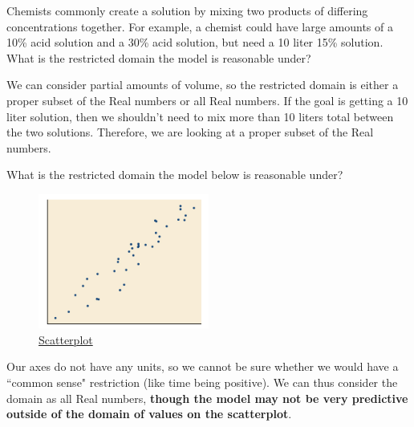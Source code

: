 \documentclass{ximera}
\begin{document}
\begin{question}
Chemists commonly create a solution by mixing two products of differing concentrations together. For example, a chemist could have large amounts of a 10\% acid solution and a 30\% acid solution, but need a 10 liter 15\% solution. What is the restricted domain the model is reasonable under?

\begin{multipleChoice}
\end{multipleChoice}

\begin{feedback}[correct]
We can consider partial amounts of volume, so the restricted domain is either a proper subset of the Real numbers or all Real numbers. If the goal is getting a 10 liter solution, then we shouldn't need to mix more than 10 liters total between the two solutions. Therefore, we are looking at a proper subset of the Real numbers. 
\end{feedback}

\end{question}

\begin{question}
What is the restricted domain the model below is reasonable under?
\begin{figure}
\includegraphics[width=0.5\textwidth]{positiveR.png}
\caption{\href{https://cnx.org/contents/mwjClAV_@8.12:6dX4RGdg@12/Fitting-Linear-Models-to-Data}{Scatterplot}}
\end{figure}

\begin{multipleChoice}
\end{multipleChoice}

\begin{feedback}[correct]
Our axes do not have any units, so we cannot be sure whether we would have a ``common sense" restriction (like time being positive). We can thus consider the domain as all Real numbers, \textbf{though the model may not be very predictive outside of the domain of values on the scatterplot}.
\end{feedback}

\end{question}
\end{document}
